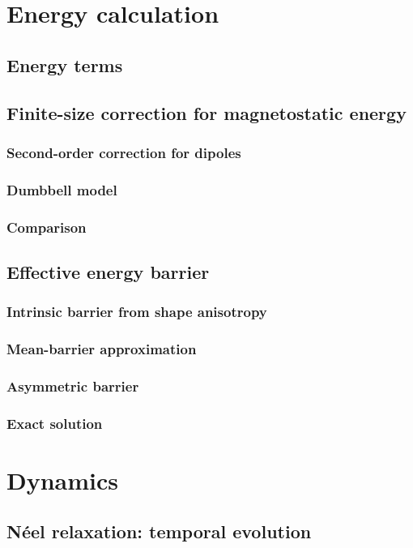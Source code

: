 \section{Energy calculation}
\subsection{Energy terms}
\subsection{Finite-size correction for magnetostatic energy}
\subsubsection{Second-order correction for dipoles}
\subsubsection{Dumbbell model}
\subsubsection{Comparison}
\subsection{Effective energy barrier}
\subsubsection{Intrinsic barrier from shape anisotropy}
\subsubsection{Mean-barrier approximation} %
\subsubsection{Asymmetric barrier}
\subsubsection{Exact solution} %

\section{Dynamics}
\subsection{N\'eel relaxation: temporal evolution}
